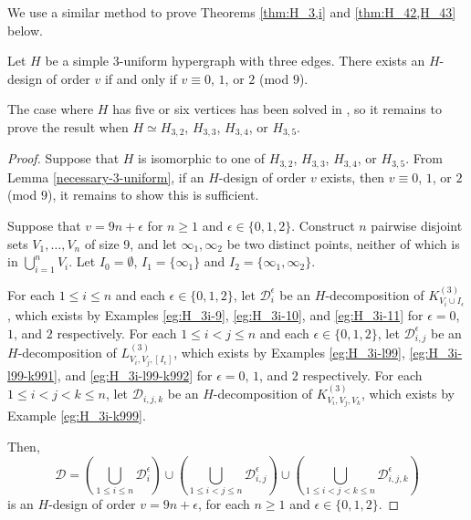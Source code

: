 We use a similar method to prove Theorems \ref{thm:H_3,i} and \ref{thm:H_42,H_43} below.

\begin{theorem} \label{thm:H_3,i}
Let $H$ be a simple $3$-uniform hypergraph with three edges.
There exists an $H$-design of order $v$ if and only if $v \equiv 0$, $1$, or $2$ (mod $9$).
\end{theorem}

The case where $H$ has five or six vertices has been solved in \cite{bryant},
so it remains to prove the result when $H \simeq H_{3,2}$, $H_{3,3}$, $H_{3,4}$, or $H_{3,5}$.

\begin{proof}
Suppose that $H$ is isomorphic to one of $H_{3,2}$, $H_{3,3}$, $H_{3,4}$, or $H_{3,5}$.
From Lemma \ref{necessary-3-uniform}, if an $H$-design of order $v$ exists, then $v \equiv 0$, $1$, or $2$ (mod $9$), it remains to show this is sufficient.

Suppose that $v = 9n + \epsilon$ for $n \geq 1$ and $\epsilon \in \{0,1,2\}$.
Construct $n$ pairwise disjoint sets $V_1, \ldots, V_n$ of size 9,
and let $\infty_1, \infty_2$ be two distinct points, neither of which is in $\bigcup_{i=1}^{n} V_i$.
Let $I_0 = \emptyset$, $I_1 = \{\infty_1\}$ and $I_2 = \{\infty_1, \infty_2\}$.

For each $1 \leq i \leq n$ and each $\epsilon \in \{0,1,2\}$, let $\mathcal{D}_i^{\epsilon}$ be an $H$-decomposition of $K_{V_i \cup I_\epsilon}^{(3)}$,
which exists by Examples \ref{eg:H_3i-9}, \ref{eg:H_3i-10}, and \ref{eg:H_3i-11} for $\epsilon = 0$, $1$, and $2$ respectively.
%
For each $1 \leq i < j \leq n$ and each $\epsilon \in \{0,1,2\}$, let $\mathcal{D}_{i,j}^{\epsilon}$ be an $H$-decomposition of $L_{V_i, V_j, [I_\epsilon]}^{(3)}$, which exists by Examples \ref{eg:H_3i-l99}, \ref{eg:H_3i-l99-k991}, and \ref{eg:H_3i-l99-k992} for $\epsilon = 0$, $1$, and $2$ respectively.
%
For each $1 \leq i < j < k \leq n$, let $\mathcal{D}_{i,j,k}$ be an $H$-decomposition of $K_{V_i,V_j,V_k}^{(3)}$, which exists by Example \ref{eg:H_3i-k999}.

Then,
\[
    \mathcal{D} = \left( \bigcup_{1 \leq i \leq n} \mathcal{D}_{i}^{\epsilon} \right)
    \cup \left( \bigcup_{1 \leq i < j \leq n} \mathcal{D}_{i,j}^{\epsilon} \right)
    \cup \left( \bigcup_{1 \leq i < j < k \leq n} \mathcal{D}_{i,j,k}^{\epsilon} \right)
\]
is an $H$-design of order $v = 9n + \epsilon$, for each $n \geq 1$ and $\epsilon \in \{0,1,2\}$.
\end{proof}

